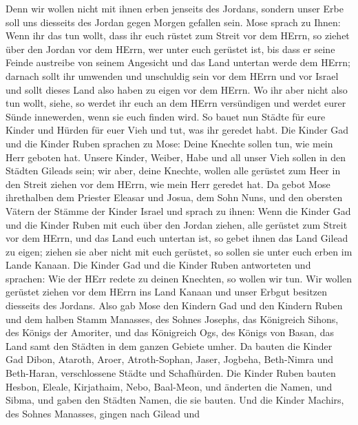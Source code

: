Denn wir wollen nicht mit ihnen erben jenseits des Jordans, sondern
unser Erbe soll uns diesseits des Jordan gegen Morgen gefallen sein.
 Mose sprach zu Ihnen: Wenn ihr das tun wollt, dass ihr
euch rüstet zum Streit vor dem HErrn,  so ziehet über den
Jordan vor dem HErrn, wer unter euch gerüstet ist, bis dass er seine
Feinde austreibe von seinem Angesicht  und das Land
untertan werde dem HErrn; darnach sollt ihr umwenden und unschuldig sein
vor dem HErrn und vor Israel und sollt dieses Land also haben zu eigen
vor dem HErrn.  Wo ihr aber nicht also tun wollt, siehe, so
werdet ihr euch an dem HErrn versündigen und werdet eurer Sünde
innewerden, wenn sie euch finden wird.  So bauet nun Städte
für eure Kinder und Hürden für euer Vieh und tut, was ihr geredet habt.
 Die Kinder Gad und die Kinder Ruben sprachen zu Mose:
Deine Knechte sollen tun, wie mein Herr geboten hat. 
Unsere Kinder, Weiber, Habe und all unser Vieh sollen in den Städten
Gileads sein;  wir aber, deine Knechte, wollen alle
gerüstet zum Heer in den Streit ziehen vor dem HErrn, wie mein Herr
geredet hat.  Da gebot Mose ihrethalben dem Priester
Eleasar und Josua, dem Sohn Nuns, und den obersten Vätern der Stämme der
Kinder Israel  und sprach zu ihnen: Wenn die Kinder Gad und
die Kinder Ruben mit euch über den Jordan ziehen, alle gerüstet zum
Streit vor dem HErrn, und das Land euch untertan ist, so gebet ihnen das
Land Gilead zu eigen;  ziehen sie aber nicht mit euch
gerüstet, so sollen sie unter euch erben im Lande Kanaan. 
Die Kinder Gad und die Kinder Ruben antworteten und sprachen: Wie der
HErr redete zu deinen Knechten, so wollen wir tun.  Wir
wollen gerüstet ziehen vor dem HErrn ins Land Kanaan und unser Erbgut
besitzen diesseits des Jordans.  Also gab Mose den Kindern
Gad und den Kindern Ruben und dem halben Stamm Manasses, des Sohnes
Josephs, das Königreich Sihons, des Königs der Amoriter, und das
Königreich Ogs, des Königs von Basan, das Land samt den Städten in dem
ganzen Gebiete umher.  Da bauten die Kinder Gad Dibon,
Ataroth, Aroer,  Atroth-Sophan, Jaser, Jogbeha,
 Beth-Nimra und Beth-Haran, verschlossene Städte und
Schafhürden.  Die Kinder Ruben bauten Hesbon, Eleale,
Kirjathaim,  Nebo, Baal-Meon, und änderten die Namen, und
Sibma, und gaben den Städten Namen, die sie bauten.  Und
die Kinder Machirs, des Sohnes Manasses, gingen nach Gilead und
